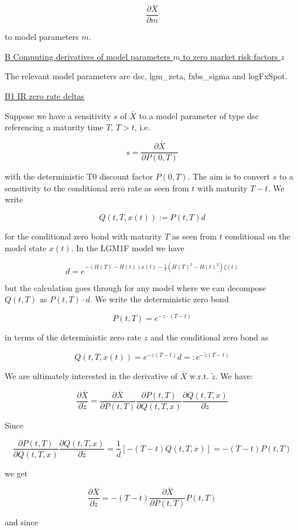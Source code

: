 $$
\frac{\partial \bar{X}}{\partial m}
$$

to model parameters $m$.


\underline{B Computing derivatives of model parameters $m$ to zero market risk factors $z$}

The relevant model parameters are dsc, lgm\_zeta, fxbs\_sigma and logFxSpot.

\underline{B1 IR zero rate deltas}

Suppose we have a sensitivity $s$ of $\bar{X}$ to a model parameter of type dsc referencing a maturity time $T$, $T >
t$, i.e.

$$
s = \frac{\partial\bar{X}}{\partial P(0,T)}
$$

with the deterministic T0 discount factor $P(0,T)$. The aim is to convert $s$ to a sensitivity to the conditional zero
rate as seen from $t$ with maturity $T-t$. We write

$$
Q(t,T,x(t)) := P(t,T) d
$$

for the conditional zero bond with maturity $T$ as seen from $t$ conditional on the model state $x(t)$. In the LGM1F
model we have

$$
d = e^{-(H(T)-H(t))x(t) - \frac{1}{2}( H(T)^2 - H(t)^2 ) \zeta(t)}
$$

but the calculation goes through for any model where we can decompose $Q(t,T)$ as $P(t,T)\cdot d$. We write the deterministic zero bond

$$
P(t,T) = e^{-z\cdot(T-t)}
$$

in terms of the deterministic zero rate $z$ and the conditional zero bond as

$$
Q(t,T,x(t)) = e^{-z (T-t)} d =: e^{-\tilde{z} (T-t)}
$$

We are ultimately interested in the derivative of $\bar{X}$ w.r.t. $\tilde{z}$. We have:

$$
\frac{\partial \bar{X}}{\partial{\tilde{z}}} = \frac{\partial \bar{X}}{\partial P(t,T)} \frac{\partial P(t,T)}{\partial Q(t,T,x)} \frac{\partial Q(t,T,x)}{\partial \tilde{z}}
$$

Since

$$
\frac{\partial P(t,T)}{\partial Q(t,T,x)} \frac{\partial Q(t,T,x)}{\partial \tilde{z}} = \frac{1}{d} \left[ -(T-t) Q(t,T,x) \right] = -(T-t)P(t,T)
$$

we get

$$
\frac{\partial \bar{X}}{\partial{\tilde{z}}} = -(T-t) \frac{\partial \bar{X}}{\partial P(t,T)} P(t,T)
$$

and since


